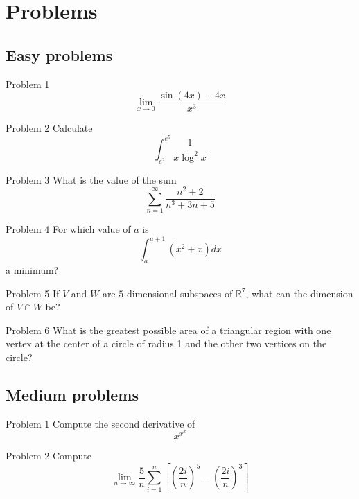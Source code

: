 \documentclass{beamer}
\begin{document}
\section{Problems}

\subsection{Easy problems}

\begin{frame}{Problem 1}
$$\lim_{x\rightarrow 0}\frac{\sin(4x)-4x}{x^3}$$
\end{frame}

\begin{frame}{Problem 2}
Calculate
$$\int_{e^2}^{e^5} \frac{1}{x\log^2 x}$$
\end{frame}

\begin{frame}{Problem 3}
What is the value of the sum
$$\sum_{n=1}^\infty \frac{n^2+2}{n^3+3n + 5}$$
\end{frame}

\begin{frame}{Problem 4}
For which value of $a$ is 
$$\int_a^{a+1} (x^2+x) dx$$
a minimum?
\end{frame}

\begin{frame}{Problem 5}
If $V$ and $W$ are $5$-dimensional subspaces of $\mathbb{R}^7$, what can the dimension of $V\cap W$ be?
\end{frame}

\begin{frame}{Problem 6}
What is the greatest possible area of a triangular region with one vertex at the center of a circle of radius 1 and
the other two vertices on the circle?
\end{frame}

\subsection{Medium problems}


\begin{frame}{Problem 1}
Compute the second derivative of
 $$x^{x^x}$$
\end{frame}

\begin{frame}{Problem 2}
Compute
$$\lim_{n\rightarrow\infty} \frac{5}{n}\sum_{i=1}^n\left[\left(\frac{2i}{n}\right)^5-\left(\frac{2i}{n}\right)^3\right]$$
\end{frame}
\end{document}
